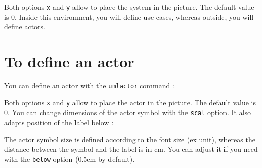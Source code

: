 \documentclass[a4paper,11pt]{report}
\newcommand{\inputTikZ}[1]{%
  }%
\newcommand{\inputTikZ}[1]{%
    \texttt{[image: fig/\#1.pdf]}%
  }%
\begin{document}
\medskip

Both options {\tt x} and {\tt y} allow to place the system in the picture. The default value is 0. Inside this environment, you will define use cases, whereas outside, you will define actors.

\section{To define an actor}\label{s.actor}

You can define an actor with the {\tt umlactor} command :

\medskip

\begin{minipage}{0.6\textwidth}

\end{minipage}
\begin{minipage}{0.4\textwidth}
\begin{center}
\inputTikZ{actor}
\end{center}
\end{minipage}

\medskip

Both options {\tt x} and {\tt y} allow to place the actor in the picture. The default value is 0. You can change dimensions of the actor symbol with the {\tt scal} option. It also adapts position of the label below :

\medskip

\begin{minipage}{0.5\textwidth}

\end{minipage}
\begin{minipage}{0.5\textwidth}
\begin{center}
\inputTikZ{actorscale}
\end{center}
\end{minipage}

\medskip

The actor symbol size is defined according to the font size (ex unit), whereas the distance between the symbol and the label is in cm. You can adjust it if you need with the {\tt below} option (0.5cm by default).

\medskip
 
\begin{minipage}{0.5\textwidth}

\end{minipage}
\begin{minipage}{0.5\textwidth}
\begin{center}
\inputTikZ{actorfont}
\end{center}
\end{minipage}
\end{document}

